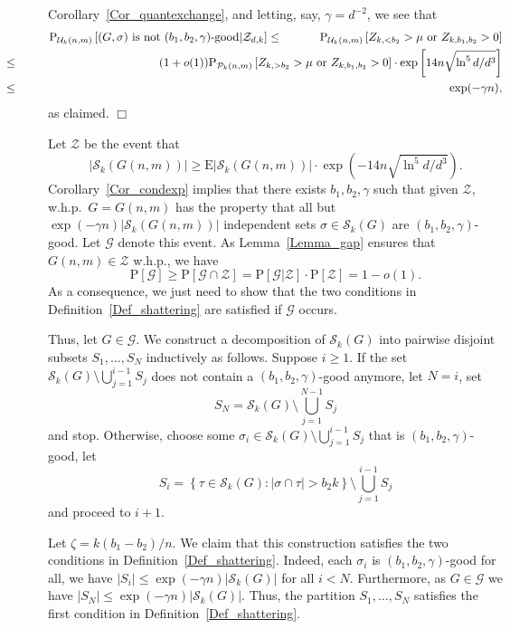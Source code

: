 \documentclass[a4paper,10pt]{article}
\makeatletter
\newenvironment{proof}{\noindent{\bf Proof\@:}}{\hfill $\Box$\\}
\newcommand\cG{\mathcal{G}}
\newcommand\cU{\mathcal{U}}
\newcommand\cS{\mathcal{S}}
\newcommand\cP{\mathcal{P}}
\newcommand\cZ{\mathcal{Z}}
\newcommand\Erw{\mathrm{E}}
\newcommand\pr{\mathrm{P}}
\newcommand\bc[1]{\left({#1}\right)}
\newcommand\cbc[1]{\left\{{#1}\right\}}
\newcommand\brk[1]{\left\lbrack{#1}\right\rbrack}
\newcommand\abs[1]{\left|{#1}\right|}
\newcommand{\whp}{w.h.p.}
\newcommand\Lem{Lemma}
\newcommand\Prop{Proposition}
\newcommand\Cor{Corollary}
\makeatother
\begin{document}
\begin{proof}
\Cor~\ref{Cor_quantexchange}, and letting, say, $\gamma=d^{-2}$, we see that
	\begin{eqnarray*}
	\pr_{\cU_k(n,m)}\brk{(G,\sigma)\mbox{ is not $(b_1,b_2,\gamma)$-good}|\cZ_{d,k}}
		&\leq&\pr_{\cU_k(n,m)}\brk{Z_{k,<b_2}>\mu\mbox{ or }Z_{k,b_1,b_2}>0}\\
		&\hspace{-8cm}\leq&\hspace{-4cm}
			(1+o(1))\pr_{\cP_k(n,m)}\brk{Z_{k,>b_2}>\mu\mbox{ or }Z_{k,b_1,b_2}>0}\cdot\exp\brk{14n\sqrt{\ln^5d/d^3}}\\
		&\hspace{-8cm}\leq&\hspace{-4cm}\exp(-\gamma n),
	\end{eqnarray*}
as claimed.
\end{proof}

\noindent{\bf Proof of \Prop~\ref{Prop_calcShattering}:}
Let $\cZ$ be the event that
	$$|\cS_k(G(n,m))|\geq\Erw|\cS_k(G(n,m))|\cdot\exp\bc{-14n\sqrt{\ln^5d/d^3}}.$$
\Cor~\ref{Cor_condexp} implies that there exists $b_1,b_2,\gamma$
such that given $\cZ$, 	\whp\ $G=G(n,m)$ has the property that all
but $\exp(-\gamma n)|\cS_k(G(n,m))|$ independent sets $\sigma\in\cS_k(G)$
are $(b_1,b_2,\gamma)$-good. Let $\cG$ denote this event.
As \Lem~\ref{Lemma_gap} ensures that $G(n,m)\in\cZ$ \whp, 
we have
		$$\pr\brk{\cG}\geq\pr\brk{\cG\cap\cZ}=\pr\brk{\cG|\cZ}\cdot\pr\brk{\cZ}=1-o(1).$$
As a consequence, we just need to show that
	the two conditions in Definition~\ref{Def_shattering} are satisfied if $\cG$ occurs.

Thus, let $G\in\cG$. We construct a decomposition of $\cS_k(G)$ 
into pairwise disjoint subsets $S_1,\ldots,S_{N}$ inductively
as follows. Suppose $i\geq1$.
If the set $\cS_k(G)\setminus\bigcup_{j=1}^{i-1}S_j$ does not contain 
a $(b_1,b_2,\gamma)$-good anymore, let $N=i$, set
	$$S_{N}=\cS_k(G)\setminus\bigcup_{j=1}^{N-1}S_j$$
and stop.
Otherwise, choose some $\sigma_i\in\cS_k(G)\setminus\bigcup_{j=1}^{i-1}S_j$ that is $(b_1,b_2,\gamma)$-good, let
	$$S_i=\cbc{\tau\in\cS_k(G):|\sigma\cap\tau|>b_2k}\setminus\bigcup_{j=1}^{i-1}S_j$$
and proceed to $i+1$.

Let $\zeta=k(b_1-b_2)/n$. We claim that this construction satisfies the two
conditions in Definition~\ref{Def_shattering}. Indeed, each $\sigma_i$ is
$(b_1,b_2,\gamma)$-good for all, we have 	$|S_i|\leq\exp(-\gamma n)\abs{\cS_k(G)}$ 
for all $i<N$. Furthermore, as $G\in\cG$ we have 
$\abs{S_N}\leq \exp(-\gamma n)\abs{\cS_k(G)}$.
Thus, the partition $S_1,\ldots,S_N$ satisfies the first condition
in Definition~\ref{Def_shattering}.
\end{document}
